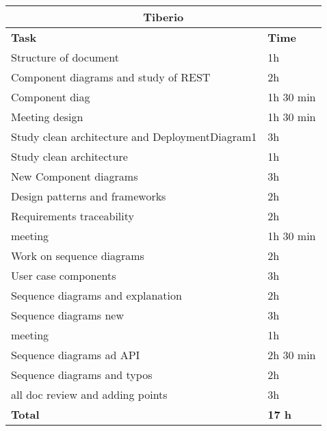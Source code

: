 \begin{table}[H]
\begin{tabular}{|l|l|}
\hline
\multicolumn{2}{|c|}{\textbf{Tiberio}}            \\ \hline
\textbf{Task}                   & \textbf{Time} \\ \hline
Structure of document                & 1h      \\ \hline
Component diagrams and study of REST       & 2h      \\ \hline
Component diag & 1h 30 min \\ \hline
Meeting design & 1h 30 min \\ \hline
Study clean architecture and DeploymentDiagram1 & 3h \\ \hline
Study clean architecture & 1h \\ \hline
New Component diagrams & 3h \\ \hline
Design patterns and frameworks & 2h \\ \hline
Requirements traceability & 2h \\ \hline
meeting & 1h 30 min \\ \hline
Work on sequence diagrams & 2h \\ \hline
User case components & 3h \\ \hline
Sequence diagrams and explanation & 2h \\ \hline
Sequence diagrams new & 3h \\ \hline
meeting & 1h \\ \hline
Sequence diagrams ad API & 2h 30 min \\ \hline
Sequence diagrams and typos & 2h \\ \hline
all doc review and adding points & 3h \\ \hline

\rowcolor {polilight}
\textbf{Total}                  & \textbf{17 h}   \\ \hline
\end{tabular}
\end{table}


